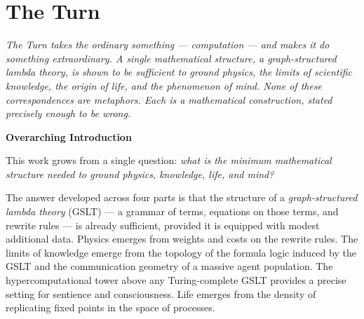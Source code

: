 \documentclass[12pt,openright,twoside]{book}
\theoremstyle{remark}
\theoremstyle{plain}
\theoremstyle{remark}
\theoremstyle{plain}
\theoremstyle{plain}
\begin{document}
\bigskip


\part{The Turn}

\vspace{1em}
\begin{mdframed}[backgroundcolor=remarkgray, linecolor=gray!60,
                 linewidth=1pt, topline=false, rightline=false,
                 bottomline=false]
\small\itshape
The Turn takes the ordinary something --- computation --- and makes it do
something extraordinary.
A single mathematical structure, a \emph{graph-structured lambda theory},
is shown to be sufficient to ground physics, the limits of scientific
knowledge, the origin of life, and the phenomenon of mind.
None of these correspondences are metaphors.
Each is a mathematical construction, stated precisely enough to be wrong.
\end{mdframed}

\bigskip

{}
{\large\bfseries\color{accentblue} Overarching Introduction}
\vspace{0.8em}

\noindent
This work grows from a single question: \emph{what is the minimum
mathematical structure needed to ground physics, knowledge, life,
and mind?}

The answer developed across four parts is that the structure of a
\emph{graph-structured lambda theory} (GSLT) --- a grammar of terms,
equations on those terms, and rewrite rules --- is already sufficient,
provided it is equipped with modest additional data.
Physics emerges from weights and costs on the rewrite rules.
The limits of knowledge emerge from the topology of the formula
logic induced by the GSLT and the communication geometry of a
massive agent population.
The hypercomputational tower above any Turing-complete GSLT
provides a precise setting for sentience and consciousness.
Life emerges from the density of replicating fixed points in the
space of processes.
\end{document}
